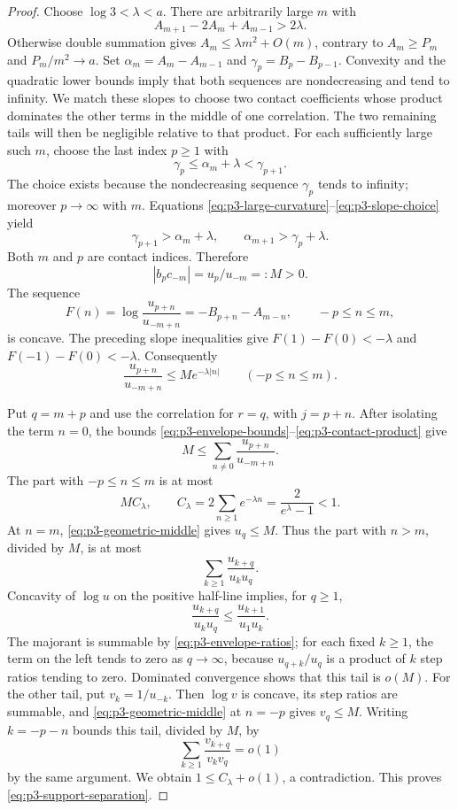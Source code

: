\begin{proof}
Choose $\log3<\lambda<a$. There are arbitrarily large $m$ with
\begin{equation}\label{eq:p3-large-curvature}
 A_{m+1}-2A_m+A_{m-1}>2\lambda.
\end{equation}
Otherwise double summation gives $A_m\leq\lambda m^2+O(m)$,
contrary to $A_m\geq P_m$ and $P_m/m^2\to a$.
Set $\alpha_m=A_m-A_{m-1}$ and $\gamma_p=B_p-B_{p-1}$.
Convexity and the quadratic lower bounds imply that both sequences
are nondecreasing and tend to infinity.
We match these slopes to choose two contact coefficients whose product
dominates the other terms in the middle of one correlation. The two
remaining tails will then be negligible relative to that product.
For each sufficiently large such $m$, choose the last index $p\geq1$ with
\begin{equation}\label{eq:p3-slope-choice}
 \gamma_p\leq\alpha_m+\lambda<\gamma_{p+1}.
\end{equation}
The choice exists because the nondecreasing sequence $\gamma_p$
tends to infinity; moreover $p\to\infty$ with $m$. Equations
\eqref{eq:p3-large-curvature}--\eqref{eq:p3-slope-choice} yield
\[
 \gamma_{p+1}>\alpha_m+\lambda,
 \qquad \alpha_{m+1}>\gamma_p+\lambda.
\]
Both $m$ and $p$ are contact indices. Therefore
\begin{equation}\label{eq:p3-contact-product}
 |b_pc_{-m}|=u_p/u_{-m}=:M>0.
\end{equation}
The sequence
\[
 F(n)=\log\frac{u_{p+n}}{u_{-m+n}}
 =-B_{p+n}-A_{m-n},\qquad -p\leq n\leq m,
\]
is concave. The preceding slope inequalities give
$F(1)-F(0)<-\lambda$ and $F(-1)-F(0)<-\lambda$.
Consequently
\begin{equation}\label{eq:p3-geometric-middle}
 \frac{u_{p+n}}{u_{-m+n}}\leq M e^{-\lambda|n|}
 \qquad(-p\leq n\leq m).
\end{equation}

Put $q=m+p$ and use the correlation for $r=q$, with $j=p+n$.
After isolating the term $n=0$, the bounds
\eqref{eq:p3-envelope-bounds}--\eqref{eq:p3-contact-product} give
\[
 M\leq\sum_{n\ne0}\frac{u_{p+n}}{u_{-m+n}}.
\]
The part with $-p\leq n\leq m$ is at most
\[
 M C_\lambda,\qquad
 C_\lambda=2\sum_{n\geq1}e^{-\lambda n}
 =\frac{2}{e^\lambda-1}<1.
\]
At $n=m$, \eqref{eq:p3-geometric-middle} gives $u_q\leq M$.
Thus the part with $n>m$, divided by $M$, is at most
\[
 \sum_{k\geq1}\frac{u_{k+q}}{u_ku_q}.
\]
Concavity of $\log u$ on the positive half-line implies, for $q\geq1$,
\[
 \frac{u_{k+q}}{u_ku_q}
 \leq\frac{u_{k+1}}{u_1u_k}.
\]
The majorant is summable by \eqref{eq:p3-envelope-ratios}; for each
fixed $k\geq1$, the term on the left tends to zero as $q\to\infty$,
because $u_{q+k}/u_q$ is a product of $k$ step ratios tending to zero.
Dominated convergence shows that this tail is $o(M)$.
For the other tail, put $v_k=1/u_{-k}$. Then $\log v$ is concave,
its step ratios are summable, and
\eqref{eq:p3-geometric-middle} at $n=-p$ gives $v_q\leq M$.
Writing $k=-p-n$ bounds this tail, divided by $M$, by
\[
 \sum_{k\geq1}\frac{v_{k+q}}{v_kv_q}=o(1)
\]
by the same argument. We obtain $1\leq C_\lambda+o(1)$, a
contradiction. This proves \eqref{eq:p3-support-separation}.


\end{proof}
